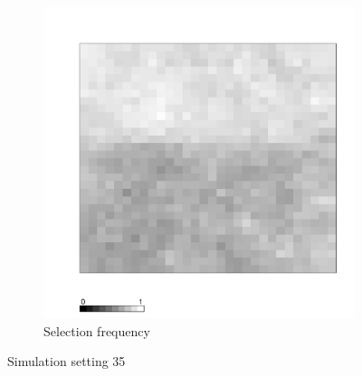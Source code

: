 \documentclass[authoryear, review, 11pt]{elsarticle}
\begin{document}
\begin{figure}
	\begin{subfigure}[b]{0.45\textwidth}
	\centering
		\includegraphics[width=\textwidth]{../../figures/simulation/X1.15.35.selection.pdf}
		\caption{Selection frequency}
	\end{subfigure}
	\caption{Simulation setting 35}
\end{figure}
\end{document}
